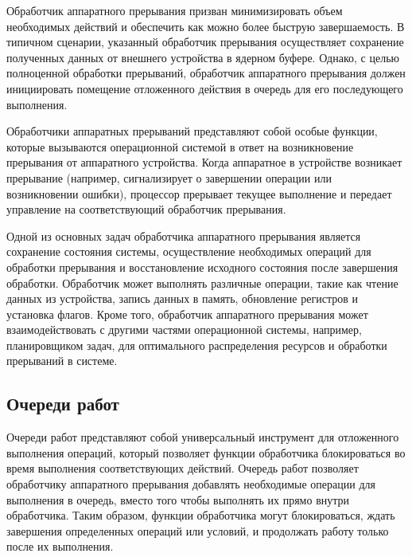 Обработчик аппаратного прерывания призван минимизировать объем необходимых действий и обеспечить как можно более быструю завершаемость.
В типичном сценарии, указанный обработчик прерывания осуществляет сохранение полученных данных от внешнего устройства в ядерном буфере.
Однако, с целью полноценной обработки прерываний, обработчик аппаратного прерывания должен инициировать помещение отложенного действия в очередь для его последующего выполнения.

Обработчики аппаратных прерываний представляют собой особые функции, которые вызываются операционной системой в ответ на возникновение прерывания от аппаратного устройства. 
Когда аппаратное в устройстве возникает прерывание (например, сигнализирует о завершении операции или возникновении ошибки), процессор прерывает текущее выполнение и передает управление на соответствующий обработчик прерывания.

Одной из основных задач обработчика аппаратного прерывания является сохранение состояния системы, осуществление необходимых операций для обработки прерывания и восстановление исходного состояния после завершения обработки. 
Обработчик может выполнять различные операции, такие как чтение данных из устройства, запись данных в память, обновление регистров и установка флагов.
Кроме того, обработчик аппаратного прерывания может взаимодействовать с другими частями операционной системы, например, планировщиком задач, для оптимального распределения ресурсов и обработки прерываний в системе.

\subsection{Очереди работ}

Очереди работ представляют собой универсальный инструмент для отложенного выполнения операций, который позволяет функции обработчика блокироваться во время выполнения соответствующих действий.
Очередь работ позволяет обработчику аппаратного прерывания добавлять необходимые операции для выполнения в очередь, вместо того чтобы выполнять их прямо внутри обработчика. Таким образом, функции обработчика могут блокироваться, ждать завершения определенных операций или условий, и продолжать работу только после их выполнения.

